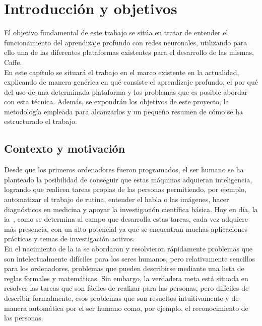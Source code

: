 \chapter{Introducción y objetivos}\label{cap.introduccion}
El objetivo fundamental de este trabajo se sitúa en tratar de entender el funcionamiento del aprendizaje profundo con redes neuronales, utilizando para ello una de las diferentes plataformas existentes para el desarrollo de las mismas, Caffe.\\

En este capítulo se situará el trabajo en el marco existente en la actualidad, explicando de manera genérica en qué consiste el aprendizaje profundo, el por qué del uso de una determinada plataforma y los problemas que es posible abordar con esta técnica. Además, se expondrán los objetivos de este proyecto, la metodología empleada para alcanzarlos y un pequeño resumen de cómo se ha estructurado el trabajo.

\section{Contexto y motivación}

Desde que los primeros ordenadores fueron programados, el ser humano se ha planteado la posibilidad de conseguir que estas máquinas adquieran inteligencia, logrando que realicen tareas propias de las personas permitiendo, por ejemplo, automatizar el trabajo de rutina, entender el habla o las imágenes, hacer diagnósticos en medicina y apoyar la investigación científica básica. Hoy en día, la \acrfull{ia}~\cite{Goodfellow-et-al-2016}, como se determina al campo que desarrolla estas tareas, cada vez adquiere más presencia, con un alto potencial ya que se encuentran muchas aplicaciones prácticas y temas de investigación activos.\\

En el nacimiento de la \acrshort{ia} se abordaron y resolvieron rápidamente problemas que son intelectualmente difíciles para los seres humanos, pero relativamente sencillos para los ordenadores, problemas que pueden describirse mediante una lista de reglas formales y matemáticas. Sin embargo, la verdadera meta está situada en resolver las tareas que son fáciles de realizar para las personas, pero difíciles de describir formalmente, esos problemas que son resueltos intuitivamente y de manera automática por el ser humano como, por ejemplo, el reconocimiento de las personas.\\

